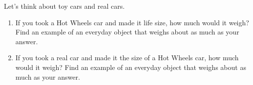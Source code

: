 \documentclass[handout,nooutcomes,noauthor,hints]{ximera}
\begin{document}
\begin{question}
  Let's think about toy cars and real cars.
  \begin{enumerate}
    \item If you took a Hot Wheels car and made it life size, how much
      would it weigh? Find an example of an everyday object that
      weighs about as much as your answer.
    \item If you took a real car and made it the size of a Hot Wheels
      car, how much would it weigh? Find an example of an everyday
      object that weighs about as much as your answer.
  \end{enumerate}
\end{question}
\end{document}
